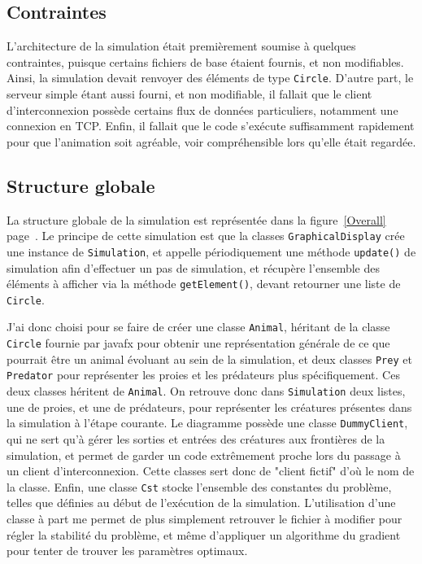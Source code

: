\documentclass[12pt,a4paper,titlepage]{article}
\begin{document}
\subsection{Contraintes}
L'architecture de la simulation était premièrement soumise à quelques contraintes, puisque certains fichiers 
de base étaient fournis, et non modifiables. Ainsi, la simulation devait renvoyer des éléments de type 
\texttt{Circle}. D'autre part, le serveur simple étant aussi fourni, et non modifiable, il fallait que le 
client d'interconnexion possède certains flux de données particuliers, notamment une connexion en TCP. Enfin, 
il fallait que le code s'exécute suffisamment rapidement pour que l'animation soit agréable, voir 
compréhensible lors qu'elle était regardée.
\FloatBarrier
\subsection{Structure globale}
La structure globale de la simulation est représentée dans la figure~\ref{Overall} page~\pageref{Overall}.
Le principe de cette simulation est que la classes \texttt{GraphicalDisplay} crée une instance de 
\texttt{Simulation}, et appelle périodiquement une méthode \texttt{update()} de simulation afin d'effectuer un 
pas de simulation, et récupère l'ensemble des éléments à afficher via la méthode \texttt{getElement()}, devant 
retourner une liste de \texttt{Circle}.

J'ai donc choisi pour se faire de créer une classe \texttt{Animal}, héritant de la classe \texttt{Circle} 
fournie par javafx pour obtenir une représentation générale de ce que pourrait être un animal évoluant au sein 
de la simulation, et deux classes \texttt{Prey} et \texttt{Predator} pour représenter les proies et les 
prédateurs plus spécifiquement. Ces deux classes héritent de \texttt{Animal}. On retrouve donc dans 
\texttt{Simulation} deux listes, une de proies, et une de prédateurs, pour représenter les créatures présentes 
dans la simulation à l'étape courante. Le diagramme possède une classe \texttt{DummyClient}, qui ne sert qu'à 
gérer les sorties et entrées des créatures aux frontières de la simulation, et permet de garder un code 
extrêmement proche lors du passage à un client d'interconnexion. Cette classes sert donc de "client fictif" 
d'où le nom de la classe. Enfin, une classe \texttt{Cst} stocke l'ensemble des constantes du problème, telles 
que définies au début de l'exécution de la simulation. L'utilisation d'une classe à part me permet de plus 
simplement retrouver le fichier à modifier pour régler la stabilité du problème, et même d'appliquer un 
algorithme du gradient pour tenter de trouver les paramètres optimaux.
\end{document}
